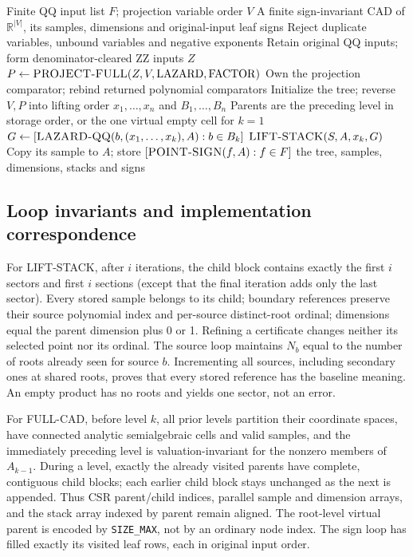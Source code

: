 \documentclass[11pt]{article}
\theoremstyle{definition}
\newcommand{\alg}[1]{\textsc{#1}}
\begin{document}
\begin{algorithm}[H]
\caption{FULL-CAD: exact rational-data projection and lifting}\label{a:fullcad}
\begin{algorithmic}[1]
\Require Finite QQ input list $F$; projection variable order $V$
\Ensure A finite sign-invariant CAD of $\mathbb R^{|V|}$, its samples, dimensions and original-input leaf signs
\State Reject duplicate variables, unbound variables and negative exponents
\State Retain original QQ inputs; form denominator-cleared ZZ inputs $Z$
\State $P\gets\alg{PROJECT-FULL}(Z,V,\mathrm{LAZARD},\mathrm{FACTOR})$
\State Own the projection comparator; rebind returned polynomial comparators
\State Initialize the tree; reverse $V,P$ into lifting order $x_1,\ldots,x_n$ and $B_1,\ldots,B_n$
 \State Parents are the preceding level in storage order, or the one virtual empty cell for $k=1$
  \State $G\gets[\alg{LAZARD-QQ}(b,(x_1,\ldots,x_k),A):b\in B_k]$
  \State $\alg{LIFT-STACK}(S,A,x_k,G)$
 \EndFor
\EndFor
{}
 \State Copy its sample to $A$; store $[\alg{POINT-SIGN}(f,A):f\in F]$
\EndFor
\State \Return the tree, samples, dimensions, stacks and signs
\end{algorithmic}
\end{algorithm}

\subsection{Loop invariants and implementation correspondence}
For LIFT-STACK, after $i$ iterations, the child block contains exactly the first
$i$ sectors and first $i$ sections (except that the final iteration adds only the
last sector). Every stored sample belongs to its child; boundary references preserve their
source polynomial index and per-source distinct-root ordinal; dimensions equal the parent dimension plus 0 or 1.
Refining a certificate changes neither its selected point nor its ordinal.
The source loop maintains $N_b$ equal to the number of roots already seen for
source $b$. Incrementing all sources, including secondary ones at shared roots,
proves that every stored reference has the baseline meaning.
An empty product has no roots and yields one sector, not an error.

For FULL-CAD, before level $k$, all prior levels partition their coordinate spaces,
have connected analytic semialgebraic cells and valid samples, and the immediately
preceding level is valuation-invariant for the nonzero members of $A_{k-1}$.
During a level, exactly the already visited parents have complete, contiguous
child blocks; each earlier child block stays unchanged as the next is appended.
Thus CSR parent/child indices, parallel sample and dimension arrays, and the stack
array indexed by parent remain aligned. The root-level virtual parent is encoded
by \texttt{SIZE\_MAX}, not by an ordinary node index. The sign loop has filled
exactly its visited leaf rows, each in original input order.
\end{document}
